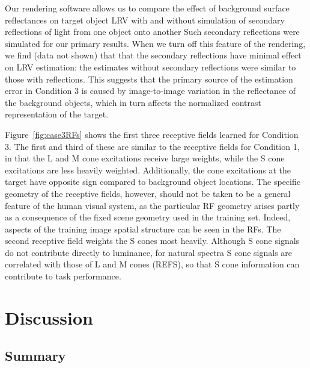 \documentclass{jov}
\begin{document}
Our rendering software allows us to compare the effect of background surface reflectances on target object LRV with and without simulation of secondary reflections of light from one object onto another
Such secondary reflections were simulated for our primary results.
When we turn off this feature of the rendering, we find (data not shown) that 
that the secondary reflections have minimal effect on LRV estimation:
the estimates without secondary reflections were similar to those with reflections.
This suggests that the primary source of the estimation error in Condition 3 is caused by image-to-image variation in the reflectance of the background objects,
which in turn affects the normalized contrast representation of the target.

Figure~\ref{fig:case3RFs} shows the first three receptive fields learned for Condition 3.
The first and third of these are similar to the receptive fields for Condition 1, in that the L and M cone excitations receive large weights, while the S cone excitations are less heavily weighted. 
Additionally, the cone excitations at the target have opposite sign compared to background object locations.
The specific geometry of the receptive fields, however, should not be taken to be a general feature of the human visual system,
as the particular RF geometry arises partly as a consequence of the fixed scene geometry used in the training set.
Indeed, aspects of the training image spatial structure can be seen in the RFs.
The second receptive field weights the S cones most heavily.
Although S cone signals do not contribute directly to luminance, for natural spectra S cone signals are correlated with
those of L and M cones (REFS), so that S cone information can contribute to task performance.

\section{Discussion} \label{Discussion}

\subsection{Summary}
\end{document}
